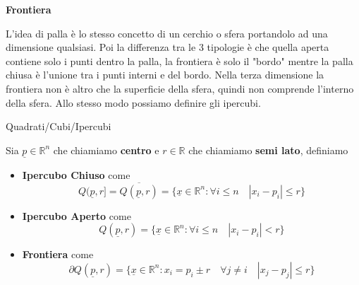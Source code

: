 \documentclass{rapport}
\begin{document}
\begin{minipage}[t]{0.32\textwidth}
  \centering
  \textbf{\small Frontiera}\\[2pt]
\end{minipage}

\vspace{0.3cm}

L'idea di palla è lo stesso concetto di un cerchio o sfera portandolo ad una dimensione qualsiasi. Poi la differenza tra le 3 tipologie è che quella aperta contiene solo i punti dentro la palla, la frontiera è solo il "bordo" mentre la palla chiusa è l'unione tra i punti interni e del bordo. Nella terza dimensione la frontiera non è altro che la superficie della sfera, quindi non comprende l'interno della sfera. Allo stesso modo possiamo definire gli ipercubi.

\begin{definizione}{Quadrati/Cubi/Ipercubi}{}

  Sia $\underline{p}\in\mathbb{R}^n$ che chiamiamo \textbf{centro} e $r\in\mathbb{R}$ che chiamiamo \textbf{semi lato}, definiamo 

  \begin{itemize}
    \item \textbf{Ipercubo Chiuso} come
    \[
    Q(\underline{p}, r] = \overline{Q(\underline{p}, r)} = \{\underline{x} \in \mathbb{R}^n : \forall i \leq n \quad |x_i - p_i| \leq r\}
    \]
    \item \textbf{Ipercubo Aperto} come
    \[
    Q(\underline{p}, r) =\{\underline{x} \in \mathbb{R}^n : \forall i \leq n \quad |x_i - p_i| < r\}
    \]
    \item \textbf{Frontiera} come
    \[
    \partial Q(\underline{p}, r) =\{\underline{x} \in \mathbb{R}^n : x_i = p_i \pm r \quad \forall j \ne  i \quad |x_j - p_j| \leq r\}
    \]
  \end{itemize}

\end{definizione}
\end{document}
